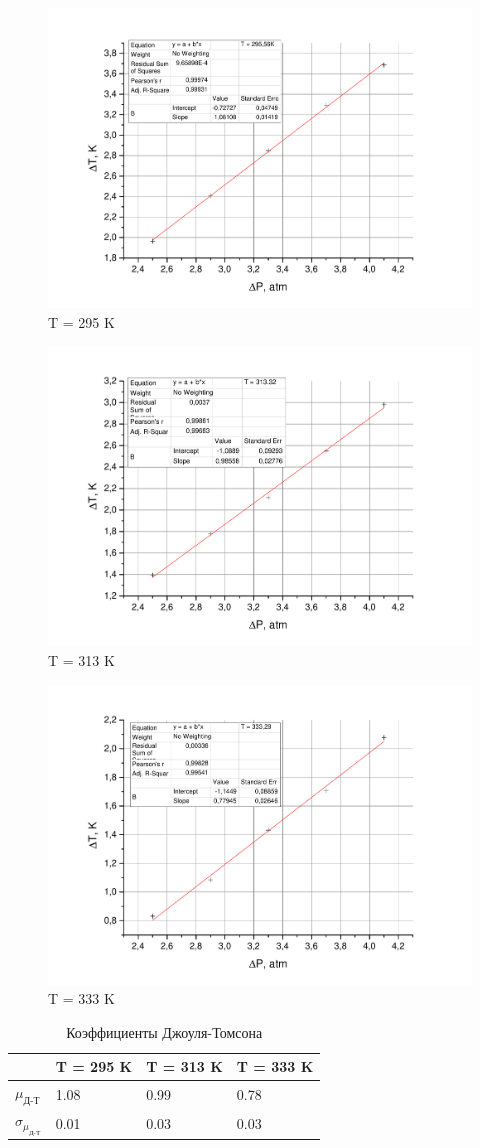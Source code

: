 \documentclass[a4paper,12pt]{article}
\begin{document}
	\begin{figure}[H]
	\includegraphics[width = 0.6\linewidth]{295K}
		\caption{T = 295 K}
	\end{figure}
	
	\begin{figure}[H]
	\includegraphics[width = 0.6\linewidth]{313K}
		\caption{T = 313 K}
	\end{figure}
	
	\begin{figure}[H]
	\includegraphics[width = 0.6\linewidth]{333K}
		\caption{T = 333 K}
	\end{figure}
	
	
\begin{table}[H]
	\caption{Коэффициенты Джоуля-Томсона}
	\centering
	\begin{tabular}{  l |  l | l | l }
		 & T = 295 K & T = 313 K & T = 333 K \\ \hline
		$\mu_{\text{Д-Т}}$ & 1.08 & 0.99 & 0.78  \\ \hline
		$\sigma_{\mu_{\text{Д-Т}}} $ & 0.01 & 0.03 & 0.03  \\ \hline
	\end{tabular}
\end{table}
\end{document}
